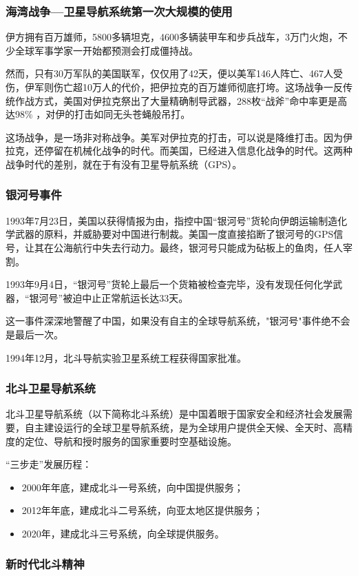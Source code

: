 \begin{frame}
    \frametitle{海湾战争---卫星导航系统第一次大规模的使用}
    伊方拥有百万雄师，5800多辆坦克，4600多辆装甲车和步兵战车，3万门火炮，不少全球军事学家一开始都预测会打成僵持战。

    然而，只有30万军队的美国联军，仅仅用了42天，便以美军146人阵亡、467人受伤，伊军则伤亡超10万人的代价，把伊拉克的百万雄师彻底打垮。这场战争一反传统作战方式，美国对伊拉克祭出了大量精确制导武器，288枚“战斧”命中率更是高达98\% ，对伊的打击如同无头苍蝇般吊打。

    这场战争，是一场非对称战争。美军对伊拉克的打击，可以说是降维打击。因为伊拉克，还停留在机械化战争的时代。而美国，已经进入信息化战争的时代。这两种战争时代的差别，就在于有没有卫星导航系统（GPS）。

\end{frame}
\begin{frame}
    \frametitle{银河号事件}
    1993年7月23日，美国以获得情报为由，指控中国“银河号”货轮向伊朗运输制造化学武器的原料，并威胁要对中国进行制裁。美国一度直接掐断了银河号的GPS信号，让其在公海航行中失去行动力。最终，银河号只能成为砧板上的鱼肉，任人宰割。

    1993年9月4日，“银河号”货轮上最后一个货箱被检查完毕，没有发现任何化学武器，“银河号”被迫中止正常航运长达33天。

    这一事件深深地警醒了中国，如果没有自主的全球导航系统，"银河号"事件绝不会是最后一次。

    1994年12月，北斗导航实验卫星系统工程获得国家批准。
\end{frame}

\begin{frame}
    \frametitle{北斗卫星导航系统 }
    北斗卫星导航系统（以下简称北斗系统）是中国着眼于国家安全和经济社会发展需要，自主建设运行的全球卫星导航系统，是为全球用户提供全天候、全天时、高精度的定位、导航和授时服务的国家重要时空基础设施。 
    \bigskip

    “三步走”发展历程：
        \begin{itemize}
          \item 2000年年底，建成北斗一号系统，向中国提供服务；
          \item 2012年年底，建成北斗二号系统，向亚太地区提供服务；
          \item 2020年，建成北斗三号系统，向全球提供服务。 
        \end{itemize}
\end{frame}

\begin{frame}
    \frametitle{新时代北斗精神}
    \begin{center}        
        {\huge {}} %
    \end{center}    
\end{frame}

